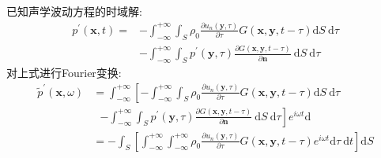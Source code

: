 \begin{enumerate}
        已知声学波动方程的时域解:
        \begin{equation}
            \begin{aligned}
                p^{\prime}(\boldsymbol{x}, t)=&-\int_{-\infty}^{+\infty} \int_{S} \rho_{0} \frac{\partial u_{n}(\boldsymbol{y}, \tau)}{\partial \tau} G(\boldsymbol{x}, \boldsymbol{y}, t-\tau) \mathrm{d} S \mathrm{~d} \tau \\
                &-\int_{-\infty}^{+\infty} \int_{S} p^{\prime}(\boldsymbol{y}, \tau) \frac{\partial G(\boldsymbol{x}, \boldsymbol{y}, t-\tau)}{\partial \boldsymbol{n}} \mathrm{~d} S \mathrm{~d} \tau
            \end{aligned}
        \end{equation}
        对上式进行Fourier变换:
        \begin{equation}
            \label{eq:part all}
            \begin{aligned}
                \tilde{p}^{\prime}(\boldsymbol{x},\omega) 
                &= \int_{-\infty}^{+\infty} \left[-\int_{-\infty}^{+\infty} \int_{S} \rho_{0} \frac{\partial u_{n}(\boldsymbol{y}, \tau)}{\partial \tau} G(\boldsymbol{x}, \boldsymbol{y}, t-\tau) \mathrm{d} S \mathrm{~d} \tau \right.\\
                &{~~~} \left. -\int_{-\infty}^{+\infty} \int_{S} p^{\prime}(\boldsymbol{y}, \tau) \frac{\partial G(\boldsymbol{x}, \boldsymbol{y}, t-\tau)}{\partial \boldsymbol{n}} \mathrm{~d} S \mathrm{~d} \tau \right] e^{i \omega t} \mathrm{d} \\
                &= - \int_{S} \left[ \int_{-\infty}^{+\infty} \int_{-\infty}^{+\infty} \rho_{0} \frac{\partial u_{n}(\boldsymbol{y}, \tau)}{\partial \tau} G(\boldsymbol{x}, \boldsymbol{y}, t-\tau) e^{i \omega t} \mathrm{d} \tau \mathrm{~d} t \right] \mathrm{d} S \\

\end{aligned}
\end{equation}
\end{enumerate}
